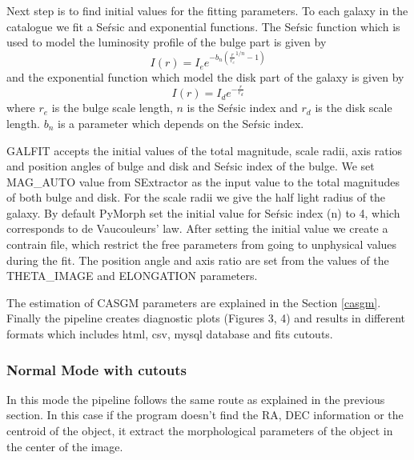 \documentclass[a4paper,10pt]{article}
\begin{document}
Next step is to find initial values for the fitting parameters.
To each galaxy in the catalogue we fit a Se\'rsic and exponential functions.
The Se\'rsic function which is used to model the luminosity profile of the bulge part is given by
\begin{equation}
 I(r) = I_e e^{-b_n (\frac{r}{r_e}^{1/n} - 1)}
\end{equation}
 and the exponential function which model the disk part of the galaxy is given by
\begin{equation}
 I(r) = I_d e^{-\frac{r}{r_d}}
\end{equation}
where $r_e$ is the bulge scale length, $n$ is the Se\'rsic index and $r_d$ is the disk scale length. $b_n$ is a parameter which depends on the Se\'rsic index.

GALFIT accepts the initial values of the total magnitude, scale radii, axis ratios and position angles of bulge and disk and Se\'rsic index of the bulge.
We set MAG\_AUTO value from SExtractor as the input value to the total magnitudes of both bulge and disk.
For the scale radii we give the half light radius of the galaxy.
By default PyMorph set the initial value for Se\'rsic index (n) to 4, which corresponds to de Vaucouleurs' law.
After setting the initial value we create a contrain file, which restrict the free parameters from going to unphysical values during the fit.
The position angle and axis ratio are set from the values of the THETA\_IMAGE and ELONGATION parameters.

The estimation of CASGM parameters are explained in the Section \ref{casgm}. Finally the pipeline creates diagnostic plots (Figures 3, 4) and results in different formats which includes html, csv, mysql database and fits cutouts.

\subsubsection{Normal Mode with cutouts}
 In this mode the pipeline follows the same route as explained in the previous section. In this case if the program doesn't find the RA, DEC information or the centroid of the object, it extract the morphological parameters of the object in the center of the image. 
\end{document}

